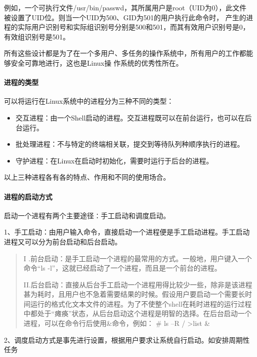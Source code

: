 \documentclass[letterpaper,10pt]{sphinxmanual}
\begin{document}
例如，一个可执行文件/usr/bin/passwd，其所属用户是root（UID为0），此文件被设置了UID位。则当一个UID为500、GID为501的用户执行此命令时，
产生的进程的实际用户识别号和实际组识别号分别是500和501，而其有效用户识别号是0，有效组识别号是501。

所有这些设计都是为了在一个多用户、多任务的操作系统中，所有用户的工作都能够安全可靠地进行，这也是Linux操
作系统的优秀性所在。


\paragraph{进程的类型}
\label{Linux_pro_mana/process:id4}
可以将运行在Linux系统中的进程分为三种不同的类型：
\begin{itemize}
\item {} 
交互进程：由一个Shell启动的进程。交互进程既可以在前台运行，也可以在后台运行。

\item {} 
批处理进程：不与特定的终端相关联，提交到等待队列种顺序执行的进程。

\item {} 
守护进程：在Linux在启动时初始化，需要时运行于后台的进程。

\end{itemize}

以上三种进程各有各的特点、作用和不同的使用场合。


\paragraph{进程的启动方式}
\label{Linux_pro_mana/process:id5}
启动一个进程有两个主要途径∶手工启动和调度启动。

1、手工启动：由用户输入命令，直接启动一个进程便是手工启动进程。手工启动进程又可以分为前台启动和后台启动。
\begin{quote}

I .前台启动：是手工启动一个进程的最常用的方式。一般地，用户键入一个命令“ls -l”，这就已经启动了一个进程，而且是一个前台的进程。

II.后台启动：直接从后台手工启动一个进程用得比较少一些，除非是该进程甚为耗时，且用户也不急着需要结果的时候。假设用户要启动一个需要长时间运行的格式化文本文件的进程。为了不使整个shell在耗时进程的运行过程中都处于“瘫痪”状态，从后台启动这个进程是明智的选择。在后台启动一个进程，可以在命令行后使用\&命令，例如： \# ls –R / \textgreater{}list \&
\end{quote}

2、调度启动方式是事先进行设置，根据用户要求让系统自行启动。如安排周期性任务
\end{document}
